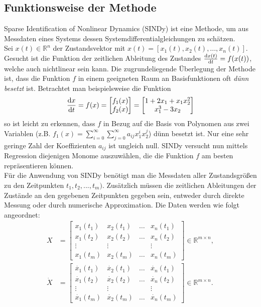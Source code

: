 \documentclass[arbeit=studie,oneside,BCOR=12mm]{ArbeitRST}
\begin{document}
\subsection{Funktionsweise der Methode}
Sparse Identification of Nonlinear Dynamics (SINDy) ist eine Methode, um aus Messdaten eines Systems dessen Systemdifferentialgleichungen zu schätzen.\\
Sei $x(t)\in\mathbb{R}^n$ der Zustandsvektor mit $x(t) = [x_1(t), x_2(t), ... , x_n(t)]$. Gesucht ist die Funktion der zeitlichen Ableitung des Zustandes $\dv{x(t)}{t} = f(x(t))$, welche auch nichtlinear sein kann. %
Die zugrundeliegende Überlegung der Methode ist, dass die Funktion $f$ in einem geeigneten Raum an Basisfunktionen oft \textit{dünn besetzt} ist. Betrachtet man beispielsweise die Funktion
\begin{equation}
\dv{x}{t} = f(x) = \begin{bmatrix} f_1(x)\\ f_2(x)\\ \end{bmatrix}
=\begin{bmatrix} 1+2x_1+x_1x_2^2 \\ x_1^3-3x_2\\ \end{bmatrix}
\end{equation}
so ist leicht zu erkennen, dass $f$ in Bezug auf die Basis von Polynomen aus zwei Variablen (z.B. $f_1(x)=\sum_{i=0}^{\infty}\sum_{j=0}^{\infty}a_{ij}x_1^ix_2^j$) dünn besetzt ist. Nur eine sehr geringe Zahl der Koeffizienten $a_{ij}$ ist ungleich null.
SINDy versucht nun mittels Regression diejenigen Monome auszuwählen, die die Funktion $f$ am besten repräsentieren können.\\
Für die Anwendung von SINDy benötigt man die Messdaten aller Zustandsgrößen zu den Zeitpunkten $t_1, t_2, ..., t_m)$. Zusätzlich müssen die zeitlichen Ableitungen der Zustände an den gegebenen Zeitpunkten gegeben sein, entweder durch direkte Messung oder durch numerische Approximation. Die Daten werden wie folgt angeordnet: 
\begin{align}
X &= \begin{bmatrix}
		x_1(t_1) & x_2(t_1) & \dots & x_n(t_1) \\
		x_1(t_2) & x_2(t_2) & \dots & x_n(t_2) \\
		\vdots   & \vdots   & 		& \vdots \\ 
		x_1(t_m) & x_2(t_m) & \dots & x_n(t_m)
	\end{bmatrix} \in \mathbb{R}^{m\times n},
	\\
	\dot{X} &= \begin{bmatrix} 
		\dot{x_1}(t_1) & \dot{x_2}(t_1) & \dots & \dot{x_n}(t_1) \\
		\dot{x_1}(t_2) & \dot{x_2}(t_2) & \dots & \dot{x_n}(t_2) \\
		\vdots 		   & \vdots 		& 		& \vdots \\
		\dot{x_1}(t_m) & \dot{x_2}(t_m) & \dots & \dot{x_n}(t_m)
	\end{bmatrix}  \in \mathbb{R}^{m\times n}.
\end{align}
\end{document}

